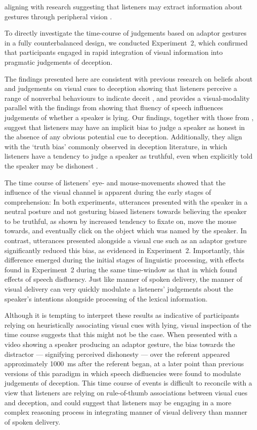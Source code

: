 \documentclass[a4paper,man,natbib]{apa6}
\begin{document}
aligning with research suggesting that listeners may extract information about gestures through peripheral vision \citep[See e.g.][]{Gullberg2006}.

To directly investigate the time-course of judgements based on adaptor gestures in a fully counterbalanced design, we conducted Experiment~2, which confirmed that participants engaged in rapid integration of visual information into pragmatic judgements of deception.

The findings presented here are consistent with previous research on beliefs about and judgements on visual cues to deception showing that listeners perceive a range of nonverbal behaviours to indicate deceit \citep[e.g.][]{Zuckerman1981, Akehurst1996, Vrij2000}, and provides a visual-modality parallel with the findings from \citet{Loy2017} showing that fluency of speech influences judgements of whether a speaker is lying.
Our findings, together with those from \citet{Loy2017}, suggest that listeners may have an implicit bias to judge a speaker as honest in the absence of any obvious potential cue to deception. 
Additionally, they align with the `truth bias' commonly observed in deception literature, in which listeners have a tendency to judge a speaker as truthful, even when explicitly told the speaker may be dishonest \citep{Vrij2000}.

The time course of listeners' eye- and mouse-movements showed that the influence of the visual channel is apparent during the early stages of comprehension:
In both experiments, utterances presented with the speaker in a neutral posture and not gesturing biased listeners towards believing the speaker to be truthful, as shown by increased tendency to fixate on, move the mouse towards, and eventually click on the object which was named by the speaker. 
In contrast, utterances presented alongside a visual cue such as an adaptor gesture significantly reduced this bias, as evidenced in Experiment~2.
Importantly, this difference emerged during the initial stages of linguistic processing, with effects found in Experiment~2 during the same time-window as that in which \citet{Loy2017} found effects of speech disfluency.
Just like manner of spoken delivery, the manner of visual delivery can very quickly modulate a listeners' judgements about the speaker's intentions alongside processing of the lexical information. 

Although it is tempting to interpret these results as indicative of participants relying on heuristically associating visual cues with lying, visual inspection of the time course suggests that this might not be the case.
When presented with a video showing a speaker producing an adaptor gesture, the bias towards the distractor --- signifying perceived dishonesty --- over the referent appeared approximately 1000~ms after the referent began, at a later point than previous versions of this paradigm in which speech disfluencies were found to modulate judgements of deception. 
This time course of events is difficult to reconcile with a view that listeners are relying on rule-of-thumb associations between visual cues and deception, and could suggest that listeners may be engaging in a more complex reasoning process in integrating manner of visual delivery than manner of spoken delivery. 
\end{document}
